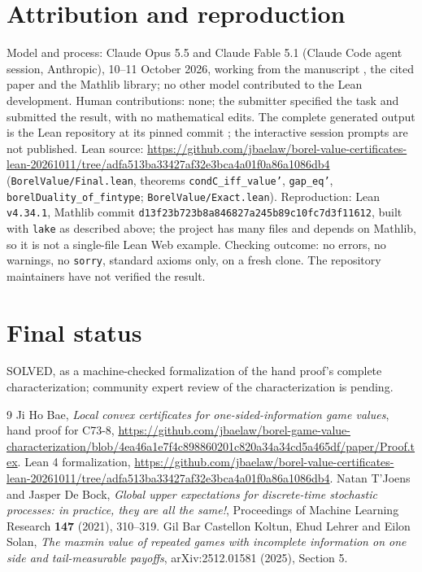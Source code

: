 \documentclass[11pt]{article}
\theoremstyle{definition}
\begin{document}
\section*{Attribution and reproduction}
Model and process: Claude Opus 5.5 and Claude Fable 5.1 (Claude Code agent session, Anthropic), 10--11 October 2026, working from the manuscript \cite{Hand}, the cited paper \cite{TDB} and the Mathlib library; no other model contributed to the Lean development. Human contributions: none; the submitter specified the task and submitted the result, with no mathematical edits. The complete generated output is the Lean repository at its pinned commit \cite{Lean}; the interactive session prompts are not published. Lean source: \url{https://github.com/jbaelaw/borel-value-certificates-lean-20261011/tree/adfa513ba33427af32e3bca4a01f0a86a1086db4} (\texttt{BorelValue/Final.lean}, theorems \texttt{condC\_iff\_value'}, \texttt{gap\_eq'}, \texttt{borelDuality\_of\_fintype}; \texttt{BorelValue/Exact.lean}). Reproduction: Lean \texttt{v4.34.1}, Mathlib commit \texttt{d13f23b723b8a846827a245b89c10fc7d3f11612}, built with \texttt{lake} as described above; the project has many files and depends on Mathlib, so it is not a single-file Lean Web example. Checking outcome: no errors, no warnings, no \texttt{sorry}, standard axioms only, on a fresh clone. The repository maintainers have not verified the result.

\section*{Final status}
SOLVED, as a machine-checked formalization of the hand proof's complete characterization; community expert review of the characterization is pending.

\begin{thebibliography}{9}
 Ji Ho Bae, \emph{Local convex certificates for one-sided-information game values}, hand proof for C73-8, \url{https://github.com/jbaelaw/borel-game-value-characterization/blob/4ea46a1e7f4c898860201c820a34a34cd5a465df/paper/Proof.tex}.
 Lean 4 formalization, \url{https://github.com/jbaelaw/borel-value-certificates-lean-20261011/tree/adfa513ba33427af32e3bca4a01f0a86a1086db4}.
 Natan T'Joens and Jasper De Bock, \emph{Global upper expectations for discrete-time stochastic processes: in practice, they are all the same!}, Proceedings of Machine Learning Research \textbf{147} (2021), 310--319.
 Gil Bar Castellon Koltun, Ehud Lehrer and Eilon Solan, \emph{The maxmin value of repeated games with incomplete information on one side and tail-measurable payoffs}, arXiv:2512.01581 (2025), Section 5.
\end{thebibliography}
\end{document}
